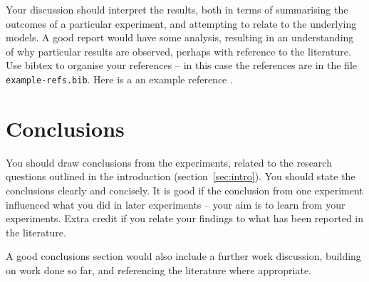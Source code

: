 \documentclass{article}
\begin{document}
Your discussion should interpret the results, both in terms of summarising the outcomes of a particular experiment, and attempting to relate to the underlying models. A good report would have some analysis, resulting in an understanding of why particular results are observed, perhaps with reference to the literature. Use bibtex to organise your references -- in this case the references are in the file \verb+example-refs.bib+.  Here is a an example reference \citep{langley00}.  




\section{Conclusions}
\label{sec:concl}
You should draw conclusions from the experiments, related to the research questions outlined in the introduction (section~\ref{sec:intro}). You should state the conclusions clearly and concisely. It is good if the conclusion from one experiment influenced what you did in later experiments -- your aim is to learn from your experiments. Extra credit if you relate your findings to what has been reported in the literature.

A good conclusions section would also include a further work discussion, building on work done so far, and referencing the literature where appropriate.


\end{document}
